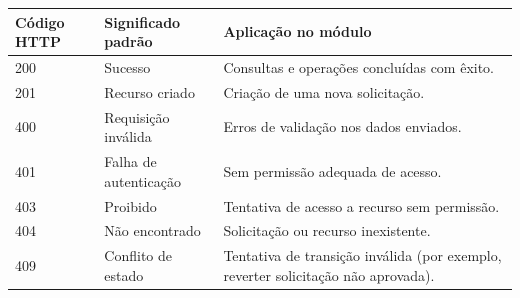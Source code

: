\begin{quadro}[!htb]
    \centering
    \caption[Códigos HTTP e suas aplicações no módulo]{Códigos HTTP, significados padrão e aplicações no módulo.
    \label{qua:codigos-http}}
    \begin{tabular}{@{}p{2.4cm}p{4cm}p{7.7cm}@{}}
        \toprule
        \textbf{Código HTTP} & \textbf{Significado padrão} & \textbf{Aplicação no módulo} \\
        \midrule
        200 & Sucesso & Consultas e operações concluídas com êxito. \\
        201 & Recurso criado & Criação de uma nova solicitação. \\
        400 & Requisição inválida & Erros de validação nos dados enviados. \\
        401 & Falha de autenticação  & Sem permissão adequada de acesso. \\
        403 & Proibido & Tentativa de acesso a recurso sem permissão. \\
        404 & Não encontrado & Solicitação ou recurso inexistente. \\
        409 & Conflito de estado & Tentativa de transição inválida (por exemplo, reverter solicitação não aprovada). \\
        \bottomrule
    \end{tabular}
\end{quadro}